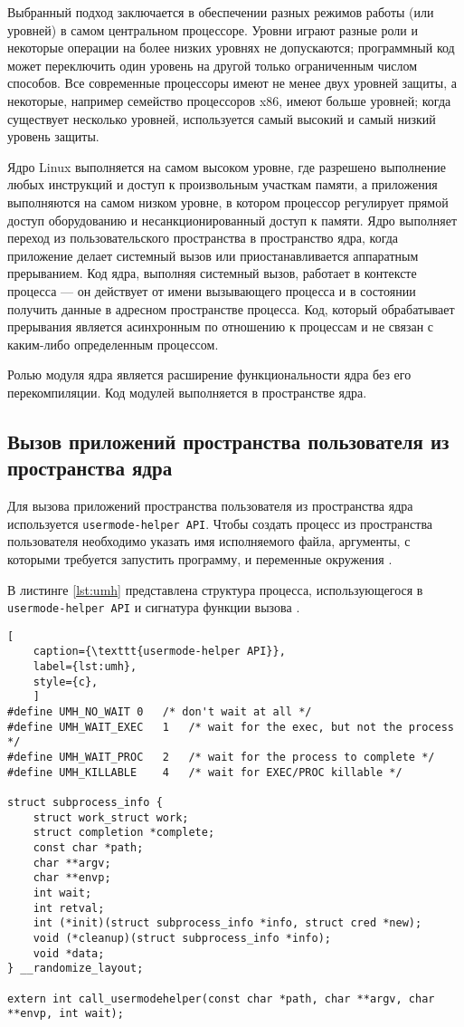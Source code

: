 Выбранный подход заключается в обеспечении разных режимов работы (или уровней) в самом центральном процессоре. Уровни играют разные роли и некоторые операции на более низких уровнях не допускаются; программный код может переключить один уровень на другой только ограниченным числом способов. Все современные процессоры имеют не менее двух уровней защиты, а некоторые, например семейство процессоров x86, имеют больше уровней; когда существует несколько уровней, используется самый высокий и самый низкий уровень защиты. 

Ядро Linux выполняется на самом высоком уровне, где разрешено выполнение любых инструкций и доступ к произвольным участкам памяти, а приложения выполняются на самом низком уровне, в котором процессор регулирует прямой доступ оборудованию и несанкционированный доступ к памяти. Ядро выполняет переход из пользовательского пространства в пространство ядра, когда приложение делает системный вызов или приостанавливается аппаратным прерыванием. Код ядра, выполняя системный вызов, работает в контексте процесса --- он действует от имени вызывающего процесса и в состоянии получить данные в адресном пространстве процесса. Код, который обрабатывает прерывания является асинхронным по отношению к процессам и не связан с каким-либо определенным процессом.

Ролью модуля ядра является расширение функциональности ядра без его перекомпиляции. Код модулей выполняется в пространстве ядра.

\subsection{Вызов приложений пространства пользователя из пространства ядра}

Для вызова приложений пространства пользователя из пространства ядра используется \texttt{usermode-helper API}. Чтобы создать процесс из пространства пользователя необходимо указать имя исполняемого файла, аргументы, с которыми требуется запустить программу, и переменные окружения \cite{umhelper}.

В листинге \ref{lst:umh} представлена структура процесса, использующегося в \texttt{usermode-helper API} и сигнатура функции вызова \cite{umh}.

\begin{lstlisting}[
	caption={\texttt{usermode-helper API}},
	label={lst:umh},
	style={c},
	]
#define UMH_NO_WAIT	0	/* don't wait at all */
#define UMH_WAIT_EXEC	1	/* wait for the exec, but not the process */
#define UMH_WAIT_PROC	2	/* wait for the process to complete */
#define UMH_KILLABLE	4	/* wait for EXEC/PROC killable */

struct subprocess_info {
	struct work_struct work;
	struct completion *complete;
	const char *path;
	char **argv;
	char **envp;
	int wait;
	int retval;
	int (*init)(struct subprocess_info *info, struct cred *new);
	void (*cleanup)(struct subprocess_info *info);
	void *data;
} __randomize_layout;

extern int call_usermodehelper(const char *path, char **argv, char **envp, int wait);
\end{lstlisting}

